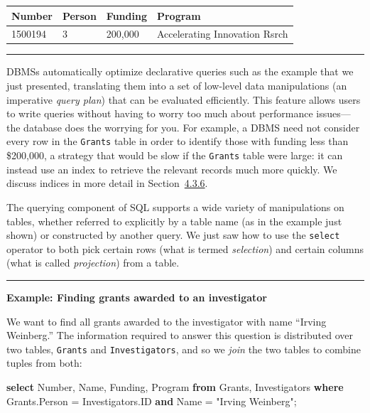 \documentclass[]{krantz}
\newenvironment{Shaded}{\begin{snugshade}}{\end{snugshade}}
\newcommand{\KeywordTok}[1]{\textcolor[rgb]{0.13,0.29,0.53}{\textbf{#1}}}
\newcommand{\DataTypeTok}[1]{\textcolor[rgb]{0.13,0.29,0.53}{#1}}
\newcommand{\OtherTok}[1]{\textcolor[rgb]{0.56,0.35,0.01}{#1}}
\newcommand{\NormalTok}[1]{#1}
\begin{document}
\begin{longtable}[]{@{}llll@{}}
\toprule
\textbf{Number} & \textbf{Person} & \textbf{Funding} &
\textbf{Program}\tabularnewline
\midrule
\endhead
1500194 & 3 & 200,000 & Accelerating Innovation Rsrch\tabularnewline
\bottomrule
\end{longtable}

\begin{center}\rule{0.5\linewidth}{\linethickness}\end{center}

DBMSs automatically optimize declarative queries such as the example
that we just presented, translating them into a set of low-level data
manipulations (an imperative \emph{query plan}) that can be evaluated
efficiently. This feature allows users to write queries without having
to worry too much about performance issues---the database does the
worrying for you. For example, a DBMS need not consider every row in the
\texttt{Grants} table in order to identify those with funding less than
\$200,000, a strategy that would be slow if the \texttt{Grants} table
were large: it can instead use an index to retrieve the relevant records
much more quickly. We discuss indices in more detail in
Section~\protect\hyperlink{sec:db:index}{4.3.6}.

The querying component of SQL supports a wide variety of manipulations
on tables, whether referred to explicitly by a table name (as in the
example just shown) or constructed by another query. We just saw how to
use the \texttt{select} operator to both pick certain rows (what is
termed \emph{selection}) and certain columns (what is called
\emph{projection}) from a table.

\begin{center}\rule{0.5\linewidth}{\linethickness}\end{center}

\textbf{Example: Finding grants awarded to an investigator}

We want to find all grants awarded to the investigator with name
``Irving Weinberg.'' The information required to answer this question is
distributed over two tables, \texttt{Grants} and \texttt{Investigators},
and so we \emph{join} the two tables to combine tuples from both:

\begin{Shaded}
\begin{Highlighting}[]
\KeywordTok{select} \DataTypeTok{Number}\NormalTok{, Name, Funding, Program}
\KeywordTok{from}\NormalTok{ Grants, Investigators}
\KeywordTok{where}\NormalTok{ Grants.Person = Investigators.ID}
\KeywordTok{and}\NormalTok{ Name = }\OtherTok{"Irving Weinberg"}\NormalTok{;}
\end{Highlighting}
\end{Shaded}
\end{document}

